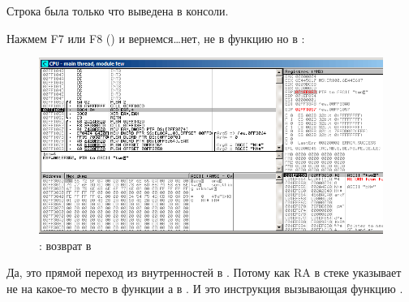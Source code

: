 Строка  была только что выведена в консоли.

\clearpage
Нажмем F7 или F8 (\stepover) и вернемся\dots нет, не в функцию \ttf но в \main:

\begin{figure}[H]
\centering
\includegraphics[scale=\FigScale]{patterns/08_switch/1_few/olly8.png}
\caption{\olly: возврат в \main}
\label{fig:switch_few_olly8}
\end{figure}

Да, это прямой переход из внутренностей \printf в \main.
Потому как \ac{RA} в стеке указывает не на какое-то место в функции \ttf а в \main.
И \CALL {} это инструкция вызывающая функцию \ttf.

